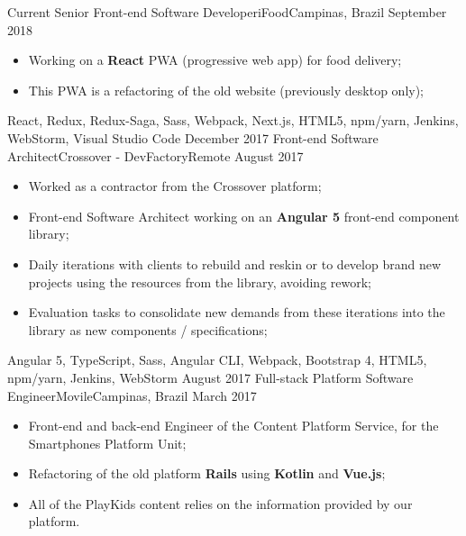 %
%
%

\begin{experiences}
  \experience
    {Current}   {Senior Front-end Software Developer}{iFood}{Campinas, Brazil}
    {September 2018} {
    \begin{itemize}
      \item Working on a \textbf{React} PWA (progressive web app) for food delivery;
      \item This PWA is a refactoring of the old website (previously desktop only);
    \end{itemize}
  }
  {React, Redux, Redux-Saga, Sass, Webpack, Next.js, HTML5, npm/yarn, Jenkins, WebStorm, Visual Studio Code}
  \emptySeparator
  \experience
    {December 2017}   {Front-end Software Architect}{Crossover - DevFactory}{Remote}
    {August 2017} {
    \begin{itemize}
      \item Worked as a contractor from the Crossover platform;
      \item Front-end Software Architect working on an \textbf{Angular 5} front-end component library;
      \item Daily iterations with clients to rebuild and reskin or to develop brand new projects using the resources from the library, avoiding rework;
      \item Evaluation tasks to consolidate new demands from these iterations into the library as new components / specifications;
    \end{itemize}
  }
  {Angular 5, TypeScript, Sass, Angular CLI, Webpack, Bootstrap 4, HTML5, npm/yarn, Jenkins, WebStorm}
  \emptySeparator
  \experience
    {August 2017}   {Full-stack Platform Software Engineer}{Movile}{Campinas, Brazil}
    {March 2017} {
    \begin{itemize}
      \item Front-end and back-end Engineer of the Content Platform Service, for the Smartphones Platform Unit;
      \item Refactoring of the old platform \textbf{Rails} using \textbf{Kotlin} and \textbf{Vue.js};
      \item All of the PlayKids content relies on the information provided by our platform.\\

\end{itemize}}
\end{experiences}
